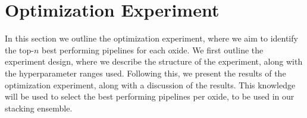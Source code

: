 \section{Optimization Experiment}\label{sec:optimization_experiment}
In this section we outline the optimization experiment, where we aim to identify the top-$n$ best performing pipelines for each oxide.
We first outline the experiment design, where we describe the structure of the experiment, along with the hyperparameter ranges used.
Following this, we present the results of the optimization experiment, along with a discussion of the results.
This knowledge will be used to select the best performing pipelines per oxide, to be used in our stacking ensemble. 